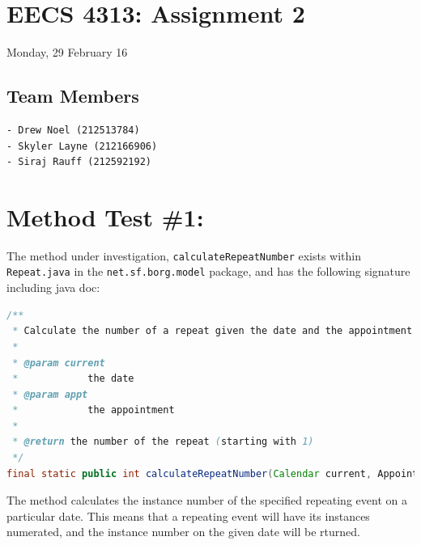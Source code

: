 \usepackage{xcolor}
\usepackage[margin=1in]{geometry}

\section{EECS 4313: Assignment 2}\label{eecs-4313-assignment-2}

Monday, 29 February 16

\subsection{Team Members}\label{team-members}

\begin{lstlisting}
- Drew Noel (212513784)
- Skyler Layne (212166906)
- Siraj Rauff (212592192)
\end{lstlisting}

\newpage

\section{Method Test \#1:}\label{method-test-1}

The method under investigation, \lstinline!calculateRepeatNumber! exists
within \lstinline!Repeat.java! in the \lstinline!net.sf.borg.model!
package, and has the following signature including java doc:

\begin{lstlisting}[language=Java]
/**
 * Calculate the number of a repeat given the date and the appointment
 *
 * @param current
 *            the date
 * @param appt
 *            the appointment
 *
 * @return the number of the repeat (starting with 1)
 */
final static public int calculateRepeatNumber(Calendar current, Appointment appt)
\end{lstlisting}

The method calculates the instance number of the specified repeating
event on a particular date. This means that a repeating event will have
its instances numerated, and the instance number on the given date will
be rturned.

